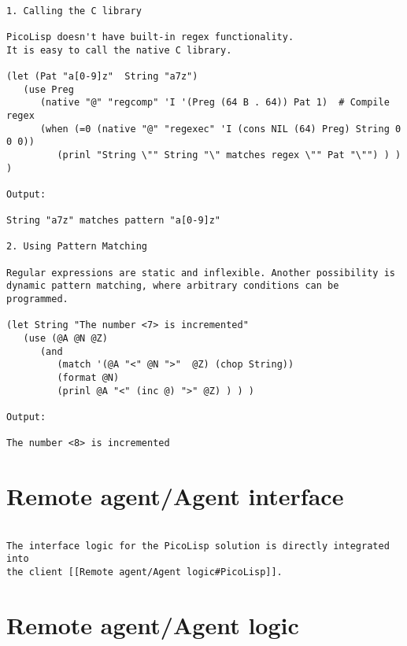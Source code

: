 \begin{verbatim}

1. Calling the C library

PicoLisp doesn't have built-in regex functionality.
It is easy to call the native C library.

(let (Pat "a[0-9]z"  String "a7z")
   (use Preg
      (native "@" "regcomp" 'I '(Preg (64 B . 64)) Pat 1)  # Compile regex
      (when (=0 (native "@" "regexec" 'I (cons NIL (64) Preg) String 0 0 0))
         (prinl "String \"" String "\" matches regex \"" Pat "\"") ) ) )

Output:

String "a7z" matches pattern "a[0-9]z"

2. Using Pattern Matching

Regular expressions are static and inflexible. Another possibility is
dynamic pattern matching, where arbitrary conditions can be programmed.

(let String "The number <7> is incremented"
   (use (@A @N @Z)
      (and
         (match '(@A "<" @N ">"  @Z) (chop String))
         (format @N)
         (prinl @A "<" (inc @) ">" @Z) ) ) )

Output:

The number <8> is incremented

\end{verbatim}

\section*{Remote agent/Agent interface}

\begin{verbatim}

The interface logic for the PicoLisp solution is directly integrated into
the client [[Remote agent/Agent logic#PicoLisp]].

\end{verbatim}

\section*{Remote agent/Agent logic}

